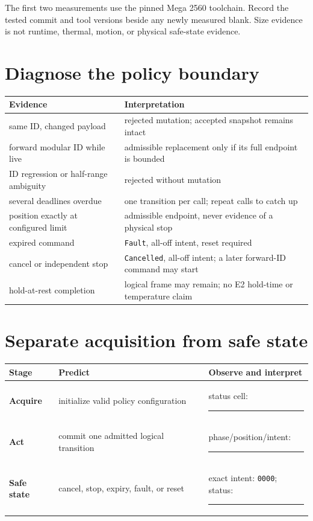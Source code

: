 \documentclass[11pt]{article}
\newcommand{\blankline}{\rule{0.88in}{0.4pt}}
\begin{document}
The first two measurements use the pinned Mega 2560 toolchain. Record the
tested commit and tool versions beside any newly measured blank. Size evidence
is not runtime, thermal, motion, or physical safe-state evidence.

\newpage
\small
\section{Diagnose the policy boundary}
\begin{tabularx}{\linewidth}{@{}l X@{}}
\toprule
Evidence & Interpretation\\
\midrule
same ID, changed payload & rejected mutation; accepted snapshot remains intact\\
forward modular ID while live & admissible replacement only if its full endpoint is bounded\\
ID regression or half-range ambiguity & rejected without mutation\\
several deadlines overdue & one transition per call; repeat calls to catch up\\
position exactly at configured limit & admissible endpoint, never evidence of a physical stop\\
expired command & \texttt{Fault}, all-off intent, reset required\\
cancel or independent stop & \texttt{Cancelled}, all-off intent; a later forward-ID command may start\\
hold-at-rest completion & logical frame may remain; no E2 hold-time or temperature claim\\
\bottomrule
\end{tabularx}

\section{Separate acquisition from safe state}
\begin{tabularx}{\linewidth}{@{}>{\bfseries}l X X@{}}
\toprule
Stage & Predict & Observe and interpret\\
\midrule
Acquire & initialize valid policy configuration & status cell: \blankline\\[8pt]
Act & commit one admitted logical transition & phase/position/intent: \blankline\\[8pt]
Safe state & cancel, stop, expiry, fault, or reset & exact intent:
\texttt{0000}; status: \blankline\\
\bottomrule
\end{tabularx}
\end{document}
